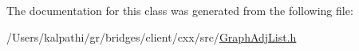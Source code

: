 The documentation for this class was generated from the following file\+:\begin{DoxyCompactItemize}
\item 
/\+Users/kalpathi/gr/bridges/client/cxx/src/\mbox{\hyperlink{_graph_adj_list_8h}{Graph\+Adj\+List.\+h}}\end{DoxyCompactItemize}
